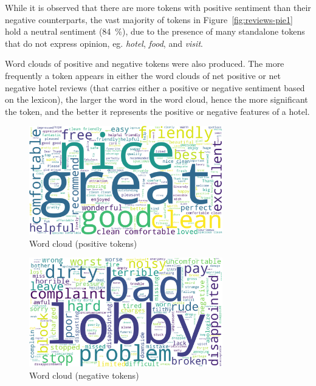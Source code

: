 \documentclass[12pt, bibliography=totocnumbered, paper=a4]{scrartcl}
\def\it#1{\textit{#1}}
\begin{document}
While it is observed that there are more tokens with positive sentiment than
their negative counterparts, the vast majority of tokens in
Figure~\ref{fig:reviews-pie1} hold a neutral sentiment (\qty{84}{\percent}),
due to the presence of many standalone tokens that do not express opinion,
eg. \it{hotel}, \it{food}, and \it{visit}.

Word clouds of positive and negative tokens were also produced.
The more frequently a token appears in either the word clouds of
net positive or net negative hotel reviews (that carries either a positive
or negative sentiment based on the lexicon), the larger the word in the word cloud,
hence the more significant the token, and the better it represents the positive
or negative features of a hotel.

\begin{figure}[htpb]
	\begin{center}
		\includegraphics[width=0.75\textwidth]{rq1/wordcloud_pos.png}
	\end{center}
	\caption{Word cloud (positive tokens)}
	\label{fig:wordcloud-pos}
\end{figure}

\begin{figure}[htpb]
	\begin{center}
		\includegraphics[width=0.75\textwidth]{rq1/wordcloud_neg.png}
	\end{center}
	\caption{Word cloud (negative tokens)}
	\label{fig:wordcloud-neg}
\end{figure}
\end{document}
